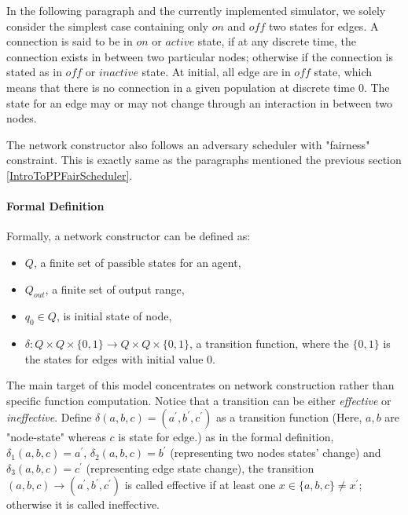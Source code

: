 \par

In the following paragraph and the currently implemented simulator, we solely consider the simplest
case containing only $on$ and $off$ two states for edges. A connection is said to be in
$on$ or $active$ state, if at any discrete time, the connection exists in between two
particular nodes; otherwise if the connection is stated as in $off$ or $inactive$ state.
At initial, all edge are in $off$ state, which means that there is no connection in a given
population at discrete time 0. The state for an edge may or may not change through an interaction
in between two nodes.

\par
The network constructor also follows an adversary scheduler with "fairness" constraint. This is
exactly same as the paragraphs mentioned the previous section \ref{IntroToPPFairScheduler}.

\paragraph{Formal Definition}
Formally, a network constructor can be defined as:
\begin{itemize}
  \item $Q$, a finite set of passible states for an agent,
  \item $Q_{out}$, a finite set of output range,
  \item $q_{0} \in Q $, is initial state of node,
  \item $\delta: Q \times Q \times \{0,1\} \to Q \times Q \times \{0,1\}$, a transition function, where the $\{0,1\}$ is the states for edges with initial value 0.
\end{itemize}

\par
The main target of this model concentrates on network construction rather than
specific function computation. Notice that a transition can be either \textit{effective}
or \textit{ineffective}. Define $\delta(a, b, c) = (a^{'}, b^{'},c^{'})$ as a transition function (Here, $a, b$ are "node-state" whereas $c$ is state for edge.)
as in the formal definition, $\delta_{1}(a,b,c) = a^{'}$, $\delta_{2}(a,b,c) = b^{'}$ (representing two nodes states' change)
and $\delta_{3}(a,b,c) = c^{'}$ (representing edge state change), the transition $(a,b,c) \to (a^{'}, b^{'},c^{'})$ is called
effective if at least one $x \in \{a,b,c\} \not= x^{'} $; otherwise it is called ineffective.


